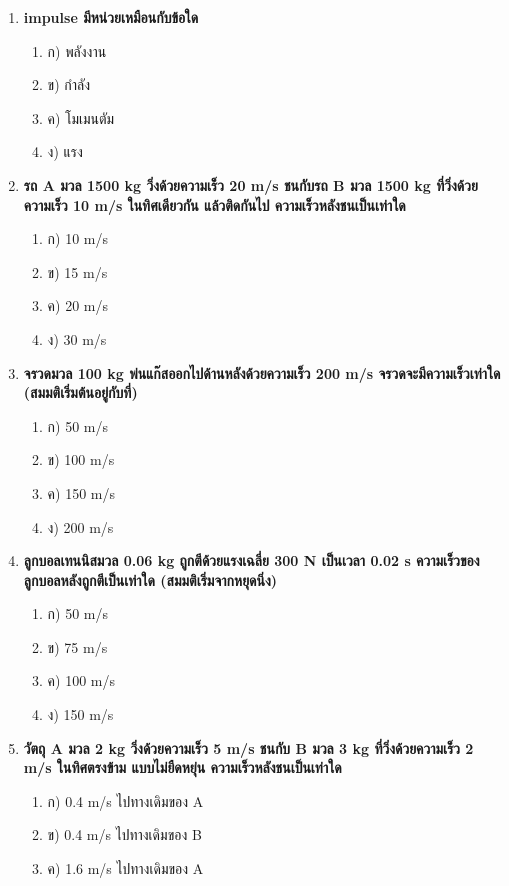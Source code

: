 \documentclass[12pt]{article}
\begin{document}
\begin{enumerate}
\begin{enumerate}
\item ค) A = -3 m/s, B = 1.5 m/s
\item ง) A = -4.5 m/s, B = 4.5 m/s
\end{enumerate}
\item \textbf{impulse มีหน่วยเหมือนกับข้อใด}
\begin{enumerate}
\item ก) พลังงาน
\item ข) กำลัง
\item ค) โมเมนตัม
\item ง) แรง
\end{enumerate}
\item \textbf{รถ A มวล 1500 kg วิ่งด้วยความเร็ว 20 m/s ชนกับรถ B มวล 1500 kg ที่วิ่งด้วยความเร็ว 10 m/s ในทิศเดียวกัน แล้วติดกันไป ความเร็วหลังชนเป็นเท่าใด}
\begin{enumerate}
\item ก) 10 m/s
\item ข) 15 m/s
\item ค) 20 m/s
\item ง) 30 m/s
\end{enumerate}
\item \textbf{จรวดมวล 100 kg พ่นแก๊สออกไปด้านหลังด้วยความเร็ว 200 m/s จรวดจะมีความเร็วเท่าใด (สมมติเริ่มต้นอยู่กับที่)}
\begin{enumerate}
\item ก) 50 m/s
\item ข) 100 m/s
\item ค) 150 m/s
\item ง) 200 m/s
\end{enumerate}
\item \textbf{ลูกบอลเทนนิสมวล 0.06 kg ถูกตีด้วยแรงเฉลี่ย 300 N เป็นเวลา 0.02 s ความเร็วของลูกบอลหลังถูกตีเป็นเท่าใด (สมมติเริ่มจากหยุดนิ่ง)}
\begin{enumerate}
\item ก) 50 m/s
\item ข) 75 m/s
\item ค) 100 m/s
\item ง) 150 m/s
\end{enumerate}
\item \textbf{วัตถุ A มวล 2 kg วิ่งด้วยความเร็ว 5 m/s ชนกับ B มวล 3 kg ที่วิ่งด้วยความเร็ว 2 m/s ในทิศตรงข้าม แบบไม่ยืดหยุ่น ความเร็วหลังชนเป็นเท่าใด}
\begin{enumerate}
\item ก) 0.4 m/s ไปทางเดิมของ A
\item ข) 0.4 m/s ไปทางเดิมของ B
\item ค) 1.6 m/s ไปทางเดิมของ A

\end{enumerate}
\end{enumerate}
\end{document}

